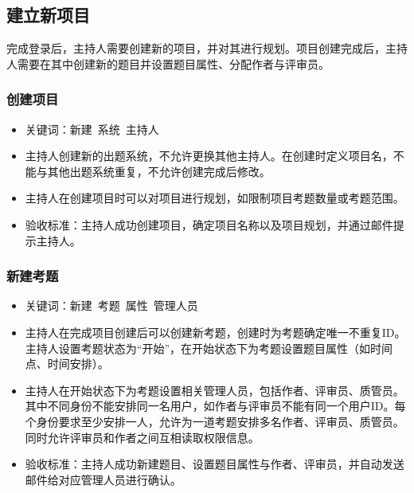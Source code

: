 \documentclass[hyperref, a4paper]{ctexart}
\providecommand{\tightlist}{%
  \setlength{\itemsep}{0pt}\setlength{\parskip}{0pt}}
\begin{document}
\hypertarget{ux5efaux7acbux65b0ux9879ux76ee}{%
\subsection{建立新项目}\label{ux5efaux7acbux65b0ux9879ux76ee}}

完成登录后，主持人需要创建新的项目，并对其进行规划。项目创建完成后，主持人需要在其中创建新的题目并设置题目属性、分配作者与评审员。

\hypertarget{ux521bux5efaux9879ux76ee}{%
\subsubsection{创建项目}\label{ux521bux5efaux9879ux76ee}}

\begin{itemize}
\tightlist
\item
  关键词：新建~系统~主持人
\item
  主持人创建新的出题系统，不允许更换其他主持人。在创建时定义项目名，不能与其他出题系统重复，不允许创建完成后修改。
\item
  主持人在创建项目时可以对项目进行规划，如限制项目考题数量或考题范围。
\item
  验收标准：主持人成功创建项目，确定项目名称以及项目规划，并通过邮件提示主持人。
\end{itemize}

\hypertarget{ux65b0ux5efaux8003ux9898}{%
\subsubsection{新建考题}\label{ux65b0ux5efaux8003ux9898}}

\begin{itemize}
\tightlist
\item
  关键词：新建~考题~属性~管理人员
\item
  主持人在完成项目创建后可以创建新考题，创建时为考题确定唯一不重复ID。主持人设置考题状态为``开始''，在开始状态下为考题设置题目属性（如时间点、时间安排）。
\item
  主持人在开始状态下为考题设置相关管理人员，包括作者、评审员、质管员。其中不同身份不能安排同一名用户，如作者与评审员不能有同一个用户ID。每个身份要求至少安排一人，允许为一道考题安排多名作者、评审员、质管员。同时允许评审员和作者之间互相读取权限信息。
\item
  验收标准：主持人成功新建题目、设置题目属性与作者、评审员，并自动发送邮件给对应管理人员进行确认。
\end{itemize}
\end{document}
